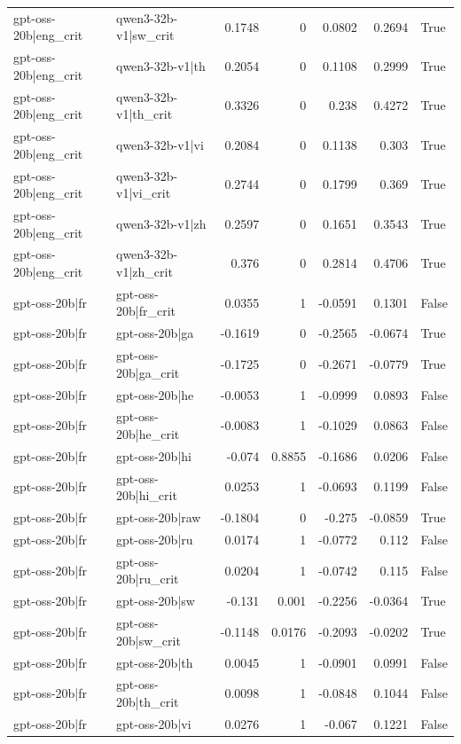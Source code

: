 \begin{table}
\begin{tabular}{l l r r r r l}
gpt-oss-20b|eng_crit & qwen3-32b-v1|sw_crit & 0.1748 & 0 & 0.0802 & 0.2694 & True \\
gpt-oss-20b|eng_crit & qwen3-32b-v1|th & 0.2054 & 0 & 0.1108 & 0.2999 & True \\
gpt-oss-20b|eng_crit & qwen3-32b-v1|th_crit & 0.3326 & 0 & 0.238 & 0.4272 & True \\
gpt-oss-20b|eng_crit & qwen3-32b-v1|vi & 0.2084 & 0 & 0.1138 & 0.303 & True \\
gpt-oss-20b|eng_crit & qwen3-32b-v1|vi_crit & 0.2744 & 0 & 0.1799 & 0.369 & True \\
gpt-oss-20b|eng_crit & qwen3-32b-v1|zh & 0.2597 & 0 & 0.1651 & 0.3543 & True \\
gpt-oss-20b|eng_crit & qwen3-32b-v1|zh_crit & 0.376 & 0 & 0.2814 & 0.4706 & True \\
gpt-oss-20b|fr & gpt-oss-20b|fr_crit & 0.0355 & 1 & -0.0591 & 0.1301 & False \\
gpt-oss-20b|fr & gpt-oss-20b|ga & -0.1619 & 0 & -0.2565 & -0.0674 & True \\
gpt-oss-20b|fr & gpt-oss-20b|ga_crit & -0.1725 & 0 & -0.2671 & -0.0779 & True \\
gpt-oss-20b|fr & gpt-oss-20b|he & -0.0053 & 1 & -0.0999 & 0.0893 & False \\
gpt-oss-20b|fr & gpt-oss-20b|he_crit & -0.0083 & 1 & -0.1029 & 0.0863 & False \\
gpt-oss-20b|fr & gpt-oss-20b|hi & -0.074 & 0.8855 & -0.1686 & 0.0206 & False \\
gpt-oss-20b|fr & gpt-oss-20b|hi_crit & 0.0253 & 1 & -0.0693 & 0.1199 & False \\
gpt-oss-20b|fr & gpt-oss-20b|raw & -0.1804 & 0 & -0.275 & -0.0859 & True \\
gpt-oss-20b|fr & gpt-oss-20b|ru & 0.0174 & 1 & -0.0772 & 0.112 & False \\
gpt-oss-20b|fr & gpt-oss-20b|ru_crit & 0.0204 & 1 & -0.0742 & 0.115 & False \\
gpt-oss-20b|fr & gpt-oss-20b|sw & -0.131 & 0.001 & -0.2256 & -0.0364 & True \\
gpt-oss-20b|fr & gpt-oss-20b|sw_crit & -0.1148 & 0.0176 & -0.2093 & -0.0202 & True \\
gpt-oss-20b|fr & gpt-oss-20b|th & 0.0045 & 1 & -0.0901 & 0.0991 & False \\
gpt-oss-20b|fr & gpt-oss-20b|th_crit & 0.0098 & 1 & -0.0848 & 0.1044 & False \\
gpt-oss-20b|fr & gpt-oss-20b|vi & 0.0276 & 1 & -0.067 & 0.1221 & False \\

\end{tabular}
\end{table}
